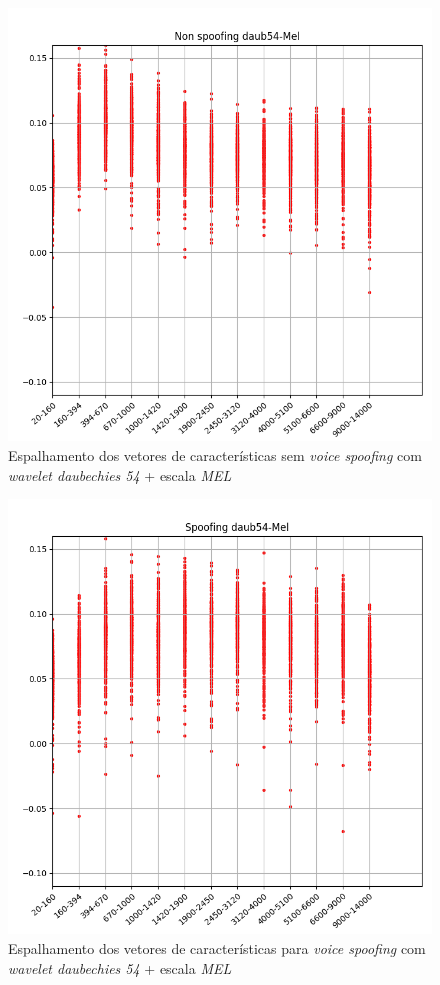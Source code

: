 		\begin{figure}[h]
			\centering
			\includegraphics[width=\linewidth]{images/results/barkVersusMel/liveDaub54Mel}
			\caption{Espalhamento dos vetores de características sem \textit{voice spoofing} com \textit{wavelet daubechies 54} + escala \textit{MEL} }
			\label{fig:livedaub54mel}
		\end{figure}
		\begin{figure}[h]
			\centering
			\includegraphics[width=\linewidth]{images/results/barkVersusMel/spoofingDaub54Mel}
			\caption{Espalhamento dos vetores de características para \textit{voice spoofing} com \textit{wavelet daubechies 54} + escala \textit{MEL} }
			\label{fig:spoofingdaub54mel}
		\end{figure}